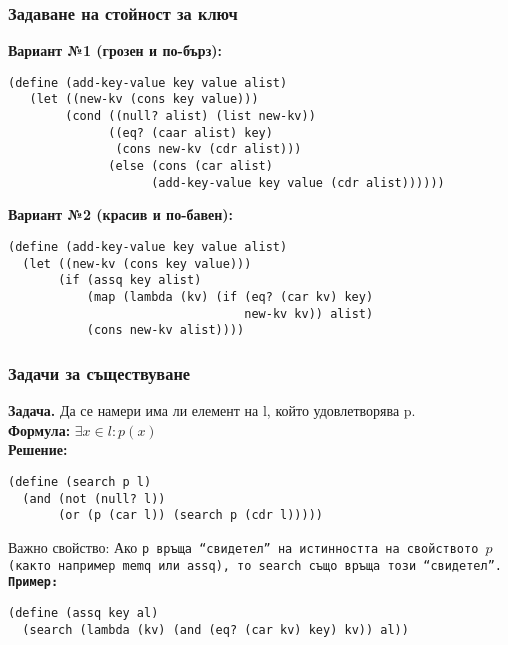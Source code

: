 \documentclass{beamer}
\begin{document}
\begin{frame}[fragile]
  \frametitle{Задаване на стойност за ключ}
\small
  \textbf{Вариант №1 (грозен и по-бърз):}
\begin{lstlisting}
(define (add-key-value key value alist)
   (let ((new-kv (cons key value)))
        (cond ((null? alist) (list new-kv))
              ((eq? (caar alist) key)
               (cons new-kv (cdr alist)))
              (else (cons (car alist)
                    (add-key-value key value (cdr alist))))))
\end{lstlisting}
  \pause
  \textbf{Вариант №2 (красив и по-бавен):}
\begin{lstlisting}
(define (add-key-value key value alist)
  (let ((new-kv (cons key value)))
       (if (assq key alist)
           (map (lambda (kv) (if (eq? (car kv) key)
                                 new-kv kv)) alist)
           (cons new-kv alist))))
\end{lstlisting}
\end{frame}

\begin{frame}[fragile]
  \frametitle{Задачи за съществуване}

  \textbf{Задача.} Да се намери има ли елемент на l, който удовлетворява p.\\
  \pause
  \textbf{Формула:} $\exists x\in l: p(x)$\\
  \pause
  \textbf{Решение:}
\begin{lstlisting}
(define (search p l)
  (and (not (null? l))
       (or (p (car l)) (search p (cdr l)))))
\end{lstlisting}
  \pause
  \alert{Важно свойство:} Ако \tt p връща ``свидетел'' на истинността на свойството $p$ (както например \tt{memq} или \tt{assq}), то \tt{search} също връща този ``свидетел''.\\
  \pause
  \textbf{Пример:}
\begin{lstlisting}
(define (assq key al)
  (search (lambda (kv) (and (eq? (car kv) key) kv)) al))
\end{lstlisting}
  \pause
\end{frame}
\end{document}
